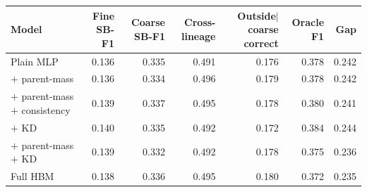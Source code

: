 \begin{tabular}{lrrrrrr}
\toprule
Model & Fine SB-F1 & Coarse SB-F1 & Cross-lineage & Outside$\mid$coarse correct & Oracle F1 & Gap \\
\midrule
Plain MLP & 0.136 & 0.335 & 0.491 & 0.176 & 0.378 & 0.242 \\
$+$ parent-mass & 0.136 & 0.334 & 0.496 & 0.179 & 0.378 & 0.242 \\
$+$ parent-mass $+$ consistency & 0.139 & 0.337 & 0.495 & 0.178 & 0.380 & 0.241 \\
$+$ KD & 0.140 & 0.335 & 0.492 & 0.172 & 0.384 & 0.244 \\
$+$ parent-mass $+$ KD & 0.139 & 0.332 & 0.492 & 0.178 & 0.375 & 0.236 \\
Full HBM & 0.138 & 0.336 & 0.495 & 0.180 & 0.372 & 0.235 \\
\bottomrule
\end{tabular}

